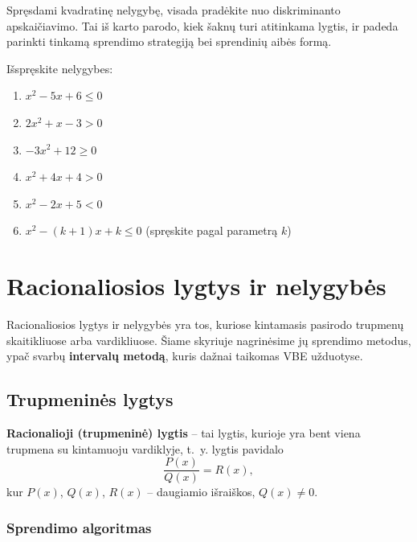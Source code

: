 \begin{tcolorbox}[title={VBE patarimas}]
Spręsdami kvadratinę nelygybę, visada pradėkite nuo diskriminanto apskaičiavimo. Tai iš karto parodo, kiek šaknų turi atitinkama lygtis, ir padeda parinkti tinkamą sprendimo strategiją bei sprendinių aibės formą.
\end{tcolorbox}

\begin{exercise}
Išspręskite nelygybes:
\begin{enumerate}[label=\alph*)]
    \item $x^2 - 5x + 6 \leq 0$
    \item $2x^2 + x - 3 > 0$
    \item $-3x^2 + 12 \geq 0$
    \item $x^2 + 4x + 4 > 0$
    \item $x^2 - 2x + 5 < 0$
    \item $x^2 - (k+1)x + k \leq 0$ (spręskite pagal parametrą $k$)
\end{enumerate}
\end{exercise}

\section{Racionaliosios lygtys ir nelygybės}

Racionaliosios lygtys ir nelygybės yra tos, kuriose kintamasis pasirodo trupmenų skaitikliuose arba vardikliuose. Šiame skyriuje nagrinėsime jų sprendimo metodus, ypač svarbų \textbf{intervalų metodą}, kuris dažnai taikomas VBE užduotyse.

\subsection{Trupmeninės lygtys}

\begin{definition}
\textbf{Racionalioji (trupmeninė) lygtis} -- tai lygtis, kurioje yra bent viena trupmena su kintamuoju vardiklyje, t.~y. lygtis pavidalo
\[
    \frac{P(x)}{Q(x)} = R(x),
\]
kur $P(x)$, $Q(x)$, $R(x)$ -- daugiamio išraiškos, $Q(x) \neq 0$.
\end{definition}

\subsubsection*{Sprendimo algoritmas}

